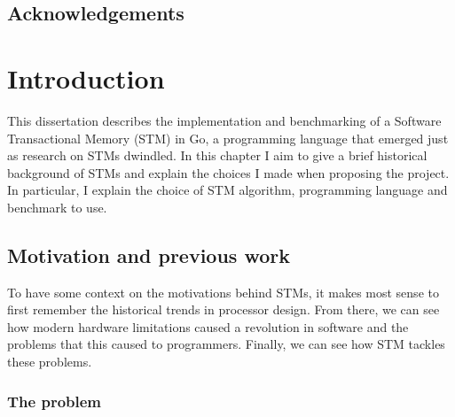 \documentclass[12pt,a4paper,oneside,openright]{report}
\begin{document}
\pagestyle{plain} 

\tableofcontents

\listoffigures{}

\listoftables{}


\newpage

\section*{Acknowledgements}



\pagestyle{headings}


\chapter{Introduction}


This dissertation describes the implementation and benchmarking of a
Software Transactional Memory (STM) in Go, a programming language that
emerged just as research on STMs dwindled. In this chapter I aim to
give a brief historical background of STMs and explain the choices I
made when proposing the project. In particular, I explain the choice
of STM algorithm, programming language and benchmark to use.

\section{Motivation and previous work}
\label{sec:motivation}

To have some context on the motivations behind STMs, it makes most
sense to first remember the historical trends in processor
design. From there, we can see how modern hardware limitations caused
a revolution in software and the problems that this caused to
programmers. Finally, we can see how STM tackles these problems.

\subsection{The problem}
\label{sec:problem}
\end{document}
